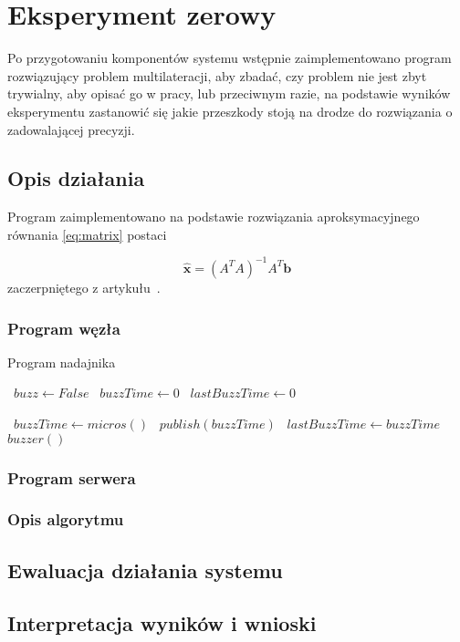 \chapter{Eksperyment zerowy}

Po przygotowaniu komponentów systemu wstępnie zaimplementowano program rozwiązujący problem multilateracji, aby zbadać, czy problem nie jest zbyt trywialny, aby opisać go w pracy, lub przeciwnym razie, na podstawie wyników eksperymentu zastanowić się jakie przeszkody stoją na drodze do rozwiązania o zadowalającej precyzji.

\section{Opis działania}

Program zaimplementowano na podstawie rozwiązania aproksymacyjnego równania \ref{eq:matrix} postaci

\begin{equation}
    \hat{\boldsymbol{x}} = {\left(A^T A\right)}^{-1} A^T \boldsymbol{b}
\end{equation}
zaczerpniętego z artykułu~\cite{norrdine2012algebraic}.

\subsection{Program węzła}

\begin{algorithm}
\caption{Program nadajnika}\label{alg:source}
\begin{algorithmic}[1]
    \State\ $buzz \gets False$
    \State\ $buzzTime \gets 0$
    \State\ $lastBuzzTime \gets 0$

        \State\ $buzzTime \gets micros()$
        \State\ $publish(buzzTime)$
        \State\ $lastBuzzTime \gets buzzTime$
        \State\ $buzzer()$
    \EndIf
\end{algorithmic}
\end{algorithm}

\subsection{Program serwera}

\subsection{Opis algorytmu}

\section{Ewaluacja działania systemu}

\section{Interpretacja wyników i wnioski}